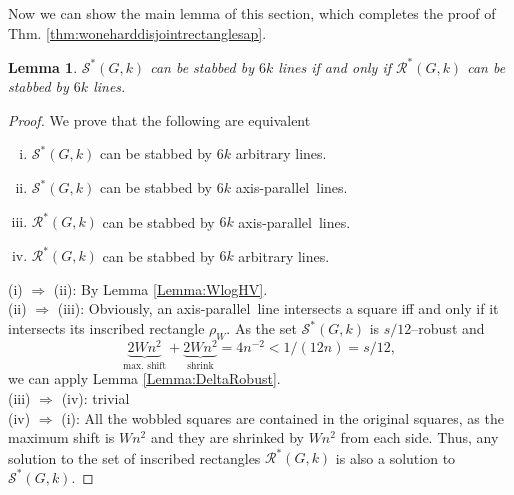 \documentclass[12pt]{article}
\newtheorem{lemma}[definition]{Lemma}
\newcommand{\ap}{a.p.\ }
\renewcommand{\ap}{axis-parallel\ }
\newcommand{\calS}{\mathcal{S}}
\newcommand{\calR}{\mathcal{R}}
\newcommand{\follows}{\Rightarrow}
\begin{document}
Now we can show the main lemma of this section, which completes the proof of Thm. \ref{thm:woneharddisjointrectanglesap}.
\begin{lemma}\label{lemma:disjointRectanglesAP} $\calS^*(G, k)$ can be stabbed by $6k$ lines if and only if $\calR^*(G, k)$ can be stabbed by $6k$ lines.
\end{lemma}
\begin{proof} We prove that the following are equivalent
\begin{enumerate}[(i)]
	\item $\calS^*(G, k)$ can be stabbed by $6k$ arbitrary lines.
	\item $\calS^*(G, k)$ can be stabbed by $6k$ \ap lines.
	\item $\calR^*(G, k)$ can be stabbed by $6k$ \ap lines.
	\item $\calR^*(G, k)$ can be stabbed by $6k$ arbitrary lines.
\end{enumerate}
(i) $\follows$ (ii): By Lemma \ref{Lemma:WlogHV}.\\
(ii) $\follows$ (iii): Obviously, an \ap line intersects a square iff and only if it intersects its inscribed rectangle $\rho_W$. As the set $\calS^*(G, k)$ is $s/12$--robust and
\[ \underbrace{2Wn^2}_{\text{max. shift}} + \underbrace{2Wn^2}_{\text{shrink}} = 4 n^{-2} < 1/\left(12n\right) = s/12, \] 
we can apply Lemma \ref{Lemma:DeltaRobust}.\\
(iii) $\follows$ (iv): trivial\\
(iv) $\follows$ (i): All the wobbled squares are contained in the original squares, as the maximum shift is $Wn^2$ and they are shrinked by $Wn^2$ from each side. Thus, any solution to the set of inscribed rectangles $\calR^*(G, k)$ is also a solution to $\calS^*(G, k)$.
\end{proof}
\end{document}
